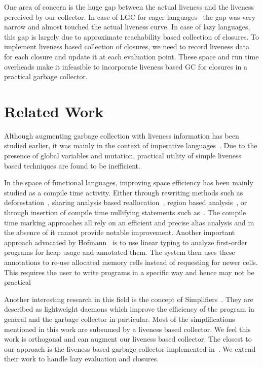 \documentclass[9pt]{sigplanconf}
\begin{document}
One area  of concern is the  huge gap between the  actual liveness and
the liveness  perceived by our  collector.  In  case of LGC  for eager
languages~\cite{asati14lgc} the gap was  very narrow and almost touched
the actual  liveness curve.  In  case of  lazy languages, this  gap is
largely   due  to   approximate  reachability   based  collection   of
closures. To implement liveness based  collection of closures, we need
to  record liveness  data  for  each closure  and  update  it at  each
evaluation  point.   These  space  and  run  time  overheads  make  it
infeasible  to  incorporate  liveness  based  GC  for  closures  in  a
practical garbage collector.


\section{Related Work} 
\label{sec:relatedwork}
Although augmenting  garbage collection with liveness  information has
been  studied earlier,  it was  mainly  in the  context of  imperative
languages~\cite{Albert, Hirzel,  khedker07heap}.  Due to  the presence
of global variables and mutation, practical utility of simple liveness
based techniques are found to be inefficient.

In the space  of functional languages, improving  space efficiency has
been  mainly  studied as  a  compile  time activity.   Either  through
rewriting                methods                such                as
deforestation~\cite{wadler88deforest,gill93ashort,chitil99deforest},
sharing  analysis   based  reallocation~\cite{jones89compile},  region
based analysis~\cite{tofte98region},  or through insertion  of compile
time              nullifying              statements              such
as~\cite{inoue88analysis,lee05static,Hamilton}.    The  compile   time
marking approaches all rely on an efficient and precise alias analysis
and in the  absence of it cannot provide  notable improvement. Another
important approach  advocated by  Hofmann~\cite{HofmannJ03} is  to use
linear  typing to  analyze  first-order programs  for  heap usage  and
annotated  them. The  system  then uses  these  annotations to  re-use
allocated memory  cells instead  of requesting  for newer  cells. This
requires the  user to write programs  in a specific way  and hence may
not be practical

Another  interesting  research  in  this   field  is  the  concept  of
Simplifiers~\cite{ONeill}. They are  described as lightweight daemons
which improve the efficiency of the program in general and the garbage
collector in particular. Most of the simplifications mentioned in this
work are subsumed by a liveness  based collector. We feel this work is
orthogonal and can augment our  liveness based collector.  The closest
to our  approach is the  liveness based garbage  collector implemented
in~\cite{asati14lgc}. We  extend their work to  handle lazy evaluation
and closures.
 
\end{document}
